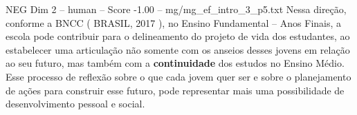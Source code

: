 \begin{textsample}{NEG Dim 2 – human – Score -1.00 – mg/mg\_ef\_intro\_3\_p5.txt}  \label{ex:f2_neg_006}
Nessa direção, conforme a BNCC ( BRASIL, 2017 ), no Ensino Fundamental – Anos Finais, a escola pode contribuir para o delineamento do projeto de vida dos estudantes, ao estabelecer uma articulação não somente com os anseios desses jovens em relação ao seu futuro, mas também com a \textbf{continuidade} dos estudos no Ensino Médio.
Esse processo de reflexão sobre o que cada jovem quer ser e sobre o planejamento de ações para construir esse futuro, pode representar mais uma possibilidade de desenvolvimento pessoal e social.

\end{textsample}
